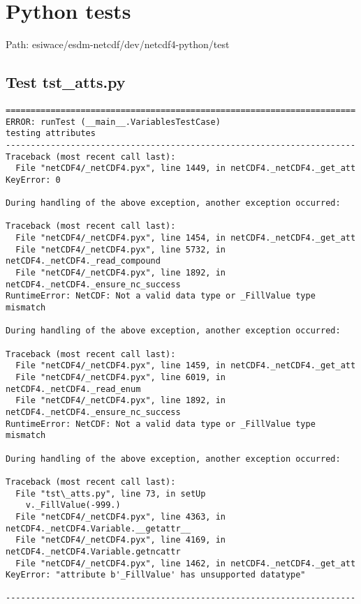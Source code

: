 \section{Python tests}

Path: esiwace/esdm-netcdf/dev/netcdf4-python/test

\subsection{Test tst\_atts.py}

\begin{verbatim}
======================================================================
ERROR: runTest (__main__.VariablesTestCase)
testing attributes
----------------------------------------------------------------------
Traceback (most recent call last):
  File "netCDF4/_netCDF4.pyx", line 1449, in netCDF4._netCDF4._get_att
KeyError: 0

During handling of the above exception, another exception occurred:

Traceback (most recent call last):
  File "netCDF4/_netCDF4.pyx", line 1454, in netCDF4._netCDF4._get_att
  File "netCDF4/_netCDF4.pyx", line 5732, in netCDF4._netCDF4._read_compound
  File "netCDF4/_netCDF4.pyx", line 1892, in netCDF4._netCDF4._ensure_nc_success
RuntimeError: NetCDF: Not a valid data type or _FillValue type mismatch

During handling of the above exception, another exception occurred:

Traceback (most recent call last):
  File "netCDF4/_netCDF4.pyx", line 1459, in netCDF4._netCDF4._get_att
  File "netCDF4/_netCDF4.pyx", line 6019, in netCDF4._netCDF4._read_enum
  File "netCDF4/_netCDF4.pyx", line 1892, in netCDF4._netCDF4._ensure_nc_success
RuntimeError: NetCDF: Not a valid data type or _FillValue type mismatch

During handling of the above exception, another exception occurred:

Traceback (most recent call last):
  File "tst\_atts.py", line 73, in setUp
    v._FillValue(-999.)
  File "netCDF4/_netCDF4.pyx", line 4363, in netCDF4._netCDF4.Variable.__getattr__
  File "netCDF4/_netCDF4.pyx", line 4169, in netCDF4._netCDF4.Variable.getncattr
  File "netCDF4/_netCDF4.pyx", line 1462, in netCDF4._netCDF4._get_att
KeyError: "attribute b'_FillValue' has unsupported datatype"

----------------------------------------------------------------------
\end{verbatim}

